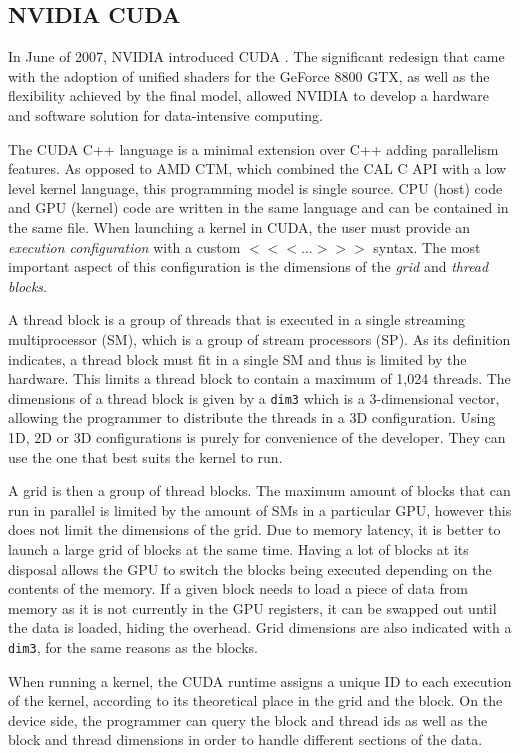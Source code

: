 \subsection{NVIDIA CUDA} \label{STATE:cuda}

In June of 2007, NVIDIA introduced CUDA \cite{cuda_toolkit_archive}. The significant redesign that came with the adoption of unified shaders for the GeForce 8800 GTX, as well as the flexibility achieved by the final model, allowed NVIDIA to develop a hardware and software solution for data-intensive computing.

The CUDA C++ language is a minimal extension over C++ adding parallelism features. As opposed to AMD CTM, which combined the CAL C API with a low level kernel language, this programming model is single source. CPU (host) code and GPU (kernel) code are written in the same language and can be contained in the same file. When launching a kernel in CUDA, the user must provide an \textit{execution configuration} with a custom $<<< ... >>>$ syntax. The most important aspect of this configuration is the dimensions of the \textit{grid} and \textit{thread blocks}.

A thread block is a group of threads that is executed in a single streaming multiprocessor (SM), which is a group of stream processors (SP). As its definition indicates, a thread block must fit in a single SM and thus is limited by the hardware. This limits a thread block to contain a maximum of 1,024 threads. The dimensions of a thread block is given by a \texttt{dim3} which is a 3-dimensional vector, allowing the programmer to distribute the threads in a 3D configuration. Using 1D, 2D or 3D configurations is purely for convenience of the developer. They can use the one that best suits the kernel to run.

A grid is then a group of thread blocks. The maximum amount of blocks that can run in parallel is limited by the amount of SMs in a particular GPU, however this does not limit the dimensions of the grid. Due to memory latency, it is better to launch a large grid of blocks at the same time. Having a lot of blocks at its disposal allows the GPU to switch the blocks being executed depending on the contents of the memory. If a given block needs to load a piece of data from memory as it is not currently in the GPU registers, it can be swapped out until the data is loaded, hiding the overhead. Grid dimensions are also indicated with a \texttt{dim3}, for the same reasons as the blocks.

When running a kernel, the CUDA runtime assigns a unique ID to each execution of the kernel, according to its theoretical place in the grid and the block. On the device side, the programmer can query the block and thread ids as well as the block and thread dimensions in order to handle different sections of the data. 

